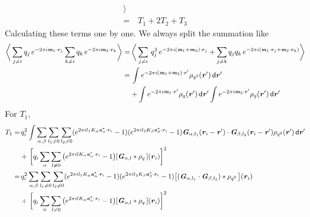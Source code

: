 \documentclass[aps,pre,preprint]{revtex4}
\renewcommand{\v}[1]{\textbf{\textit{#1}}}
\renewcommand{\d}[1]{\textsf{#1}}
\begin{document}
\begin{align}
  \bigg\rangle\\ \nonumber
  = &\, T_1 + 2T_2 + T_3
\end{align}
Calculating these terms one by one. We always split the summation like
\begin{align}\nonumber
  \bigg\langle
  \sum_{j\neq i}q_j\,e^{-2\pi i\v m_1\cdot\v r_j}
  \sum_{k\neq i}q_k\,e^{-2\pi i\v m_2\cdot\v r_k}
  \bigg\rangle
  = &\,
  \bigg\langle
  \sum_{j\neq i}\,q_j^2\,e^{-2\pi i(\v m_1 + \v m_2)\cdot\v r_j} +
  \sum_{j\neq k}q_jq_k\,e^{-2\pi i(\v m_1\cdot\v r_j + \v m_2\cdot\v r_k)}
  \bigg\rangle\\ \nonumber
  = &\,
  \int
  e^{-2\pi i(\v m_1 + \v m_2)\cdot\v r'} \rho_{q^2}(\v r')\,\d d\v r'\\
  &+
  \int e^{-2\pi i\v m_1\cdot\v r'} \rho_q(\v r')\,\d d\v r'
  \int e^{-2\pi i\v m_2\cdot\v r'} \rho_q(\v r')\,\d d\v r'
\end{align}
For $T_1$,
\begin{align}\nonumber
  T_1
  =  &\,
  q_i^2
  \int
  \sum_{\alpha,\beta} \sum_{l_1\neq 0}\sum_{l_2\neq 0}
  (e^{2\pi i l_1K_\alpha\v a^\ast_\alpha\cdot\v r_i} - 1)
  (e^{2\pi i l_2K_\beta\v a^\ast_\beta\cdot\v r_i} - 1)
  \v G_{\alpha,l_1}(\v r_i - \v r')\cdot\v G_{\beta,l_2}(\v r_i - \v r')
  \rho_{q^2}(\v r')
  \,\d d\v r' \\ \nonumber
  &+ \,
  \bigg[
  q_i \sum_{\alpha}\sum_{l\neq 0}
  \big(
  e^{2\pi ilK_\alpha\v a_\alpha^\ast\cdot\v r_i} - 1
  \big)
  [\v G_{\alpha,l}\ast\rho_q\,] (\v r_i)
  \bigg]^2 \\ \nonumber
  = &\,
  q_i^2
  \sum_{\alpha,\beta} \sum_{l_1\neq 0}\sum_{l_2\neq 0}
  (e^{2\pi i l_1K_\alpha\v a^\ast_\alpha\cdot\v r_i} - 1)
  (e^{2\pi i l_2K_\beta\v a^\ast_\beta\cdot\v r_i} - 1)
  \big[
  (\v G_{\alpha,l_1}\cdot\v G_{\beta,l_2})\ast \rho_{q^2}\,
  \big] (\v r_i) \\
  &+ \,
  \bigg[
  q_i \sum_{\alpha}\sum_{l\neq 0}
  \big(
  e^{2\pi ilK_\alpha\v a_\alpha^\ast\cdot\v r_i} - 1
  \big)
  [\v G_{\alpha,l}\ast\rho_q\,] (\v r_i)
  \bigg]^2 
\end{align}
\end{document}
